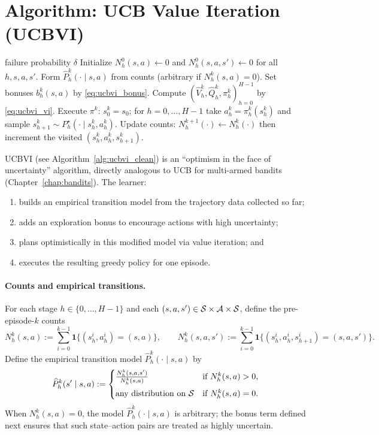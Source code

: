 \section{Algorithm: UCB Value Iteration (UCBVI)}
\label{sec:tabular_ucbvi_alg}

\begin{algorithm}[t]
\begin{algorithmic}[1]
\Require failure probability $\delta$
\State Initialize $N_h^0(s,a)\gets 0$ and $N_h^0(s,a,s')\gets 0$ for all $h,s,a,s'$.
    \State Form $\widehat P_h^k(\cdot\mid s,a)$ from counts (arbitrary if $N_h^k(s,a)=0$).
    \State Set bonuses $b_h^k(s,a)$ by \eqref{eq:ucbvi_bonus}.
    \State Compute $(\widehat V_h^k,\widehat Q_h^k,\pi_h^k)_{h=0}^{H-1}$ by \eqref{eq:ucbvi_vi}.
    \State Execute $\pi^k$: $s_0^k=s_0$; for $h=0,\dots,H-1$ take $a_h^k=\pi_h^k(s_h^k)$ and sample $s_{h+1}^k\sim P_h^\star(\cdot\mid s_h^k,a_h^k)$.
    \State Update counts: $N_h^{k+1}(\cdot)\gets N_h^k(\cdot)$ then increment the visited $(s_h^k,a_h^k,s_{h+1}^k)$.
\EndFor
\end{algorithmic}
\caption{UCBVI (episodic, tabular)}
\label{alg:ucbvi_clean}
\end{algorithm}


UCBVI (see Algorithm~\ref{alg:ucbvi_clean}) is an ``optimism in the face of uncertainty'' algorithm, directly analogous to
UCB for multi-armed bandits (Chapter~\ref{chap:bandits}). The learner:
\begin{enumerate}
\item builds an empirical transition model from the trajectory data collected so far;
\item adds an exploration bonus to encourage actions with high uncertainty;
\item plans optimistically in this modified model via value iteration; and
\item executes the resulting greedy policy for one episode.
\end{enumerate}

\paragraph{Counts and empirical transitions.}
For each stage $h\in\{0,\dots,H-1\}$ and each $(s,a,s')\in\mathcal{S}\times\mathcal{A}\times\mathcal{S}$,
define the pre-episode-$k$ counts
\[
N_h^k(s,a) := \sum_{i=0}^{k-1}\mathbf{1}\{(s_h^i,a_h^i)=(s,a)\},
\qquad
N_h^k(s,a,s') := \sum_{i=0}^{k-1}\mathbf{1}\{(s_h^i,a_h^i,s_{h+1}^i)=(s,a,s')\}.
\]
Define the empirical transition model $\widehat P_h^k(\cdot\mid s,a)$ by
\[
\widehat P_h^k(s'\mid s,a) :=
\begin{cases}
\frac{N_h^k(s,a,s')}{N_h^k(s,a)} & \text{if } N_h^k(s,a)>0,\\[6pt]
\text{any distribution on $\mathcal{S}$} & \text{if } N_h^k(s,a)=0.
\end{cases}
\]
When $N_h^k(s,a)=0$, the model $\widehat P_h^k(\cdot\mid s,a)$ is arbitrary; the bonus term
defined next ensures that such state--action pairs are treated as highly uncertain.

